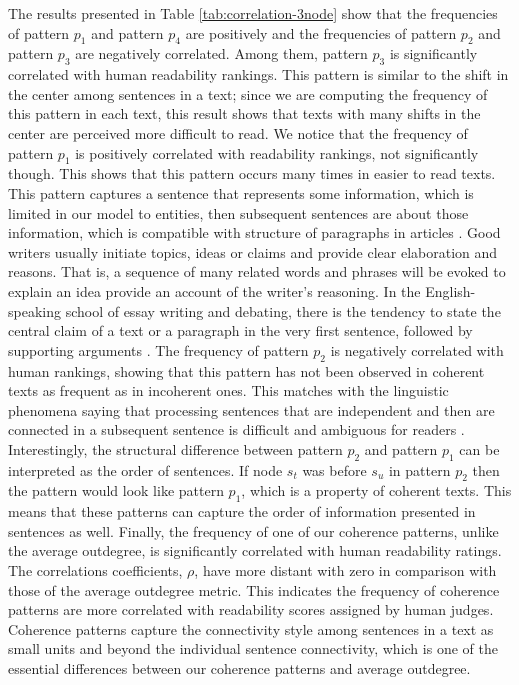 The results presented in Table \ref{tab:correlation-3node} show that the frequencies of pattern $p_1$ and pattern $p_4$ are positively and the frequencies of pattern $p_2$ and pattern $p_3$ are negatively correlated. 
Among them, pattern $p_3$ is significantly correlated with human readability rankings. 
This pattern is similar to the shift in the center among sentences in a text; since we are computing the frequency of this pattern in each text, this result shows that texts with many shifts in the center are perceived more difficult to read. 
We notice that the frequency of pattern $p_1$ is positively correlated with readability rankings, not significantly though. 
This shows that this pattern occurs many times in easier to read texts.  
This pattern captures a sentence that represents some information, which is limited in our model to entities, then  subsequent sentences are about those information, which is compatible with structure of paragraphs in articles \cite{}. 
Good writers usually initiate topics, ideas or claims and provide clear elaboration and reasons. 
That is, a sequence of many related words and phrases will be evoked to explain an idea provide an account of the writer's reasoning. 
In the English-speaking school of essay writing and debating, there is the tendency to state the central claim of a text or a paragraph in the very first sentence, followed by supporting arguments \cite{peldszus15}. 
The frequency of pattern $p_2$ is negatively correlated with human rankings, showing that this pattern has not been observed in coherent texts as frequent as in incoherent ones. 
This matches with the linguistic phenomena saying that processing sentences that are independent and then are connected in a subsequent sentence is difficult and ambiguous for readers \cite{}. 
Interestingly, the structural difference between pattern $p_2$ and pattern $p_1$ can be interpreted as the order of sentences. 
If node $s_t$ was before $s_u$ in pattern $p_2$ then the pattern would look like pattern $p_1$, which is a property of coherent texts. 
This means that these patterns can capture the order of information presented in sentences as well. 
Finally, the frequency of one of our coherence patterns, unlike the average outdegree, is significantly correlated with human readability ratings. 
The correlations coefficients, $\rho$, have more distant with zero in comparison with those of the average outdegree metric. 
This indicates the frequency of coherence patterns are more correlated with readability scores assigned by human judges. 
Coherence patterns capture the connectivity style among sentences in a text as small units and beyond the individual  sentence connectivity, which is one of the essential differences between our coherence patterns and average outdegree. 


